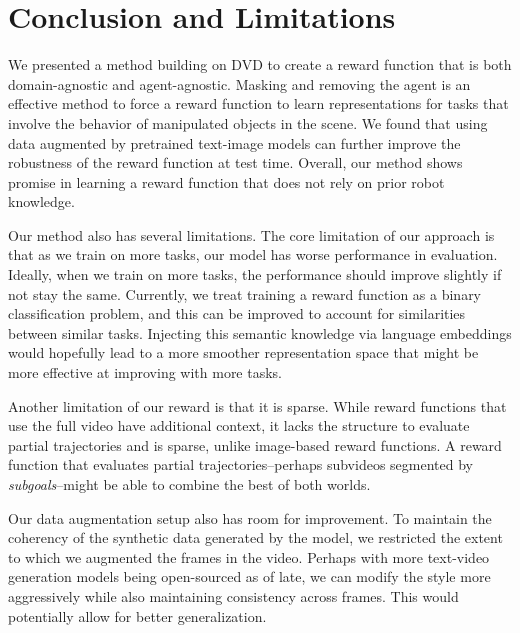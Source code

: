 \section{Conclusion and Limitations}
\label{sec:conclusions_reward}

We presented a method building on DVD \cite{DVD} to create a reward function that is both domain-agnostic and agent-agnostic. Masking and removing the agent is an effective method to force a reward function to learn representations for tasks that involve the behavior of manipulated objects in the scene. We found that using data augmented by pretrained text-image models can further improve the robustness of the reward function at test time. Overall, our method shows promise in learning a reward function that does not rely on prior robot knowledge.

Our method also has several limitations. The core limitation of our approach is that as we train on more tasks, our model has worse performance in evaluation. Ideally, when we train on more tasks, the performance should improve slightly if not stay the same. Currently, we treat training a reward function as a binary classification problem, and this can be improved to account for similarities between similar tasks. Injecting this semantic knowledge via language embeddings would hopefully lead to a more smoother representation space that might be more effective at improving with more tasks.

Another limitation of our reward is that it is sparse. While reward functions that use the full video have additional context, it lacks the structure to evaluate partial trajectories and is sparse, unlike image-based reward functions. A reward function that evaluates partial trajectories--perhaps subvideos segmented by \textit{subgoals}--might be able to combine the best of both worlds.

Our data augmentation setup also has room for improvement. To maintain the coherency of the synthetic data generated by the model, we restricted the extent to which we augmented the frames in the video. Perhaps with more text-video generation models being open-sourced as of late, we can modify the style more aggressively while also maintaining consistency across frames. This would potentially allow for better generalization.